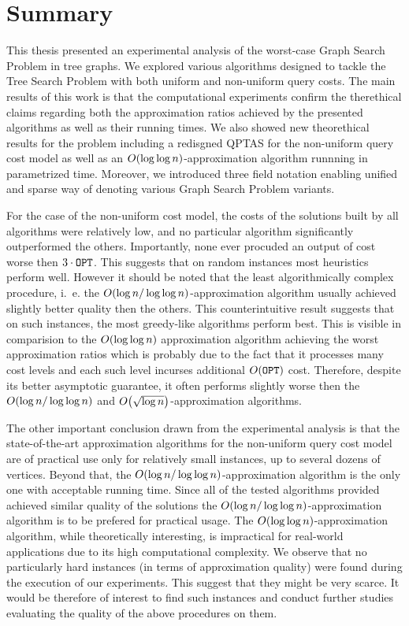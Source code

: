 \chapter{Summary}

This thesis presented an experimental analysis of the worst-case Graph Search Problem in tree graphs. We explored various algorithms designed to tackle the Tree Search Problem with both uniform and non-uniform query costs. The main results of this work is that the computational experiments confirm the therethical claims regarding both the approximation ratios achieved by the presented algorithms as well as their running times. We also showed new theorethical results for the problem including a redisgned QPTAS for the non-uniform query cost model as well as an $O\mathopen{}\left( \log \log n \right)$-approximation algorithm runnning in parametrized time. Moreover, we introduced three field notation enabling unified and sparse way of denoting various Graph Search Problem variants.

For the case of the non-uniform cost model, the costs of the solutions built by all algorithms were relatively low, and no particular algorithm significantly outperformed the others. Importantly, none ever procuded an output of cost worse then $3\cdot\texttt{OPT}$. This suggests that on random instances most heuristics perform well. However it should be noted that the least algorithmically complex procedure, i.~e. the $O\mathopen{}\left( \log n/\log\log n \right)$-approximation algorithm usually achieved slightly better quality then the others. This counterintuitive result suggests that on such instances, the most greedy-like algorithms perform best. This is visible in comparision to the $O\mathopen{}\left( \log \log n \right)$ approximation algorithm achieving the worst approximation ratios which is probably due to the fact that it processes many cost levels and each such level incurses additional $O\mathopen{}\left( \texttt{OPT} \right)$ cost. Therefore, despite its better asymptotic guarantee, it often performs slightly worse then the $O\mathopen{}\left( \log n/\log\log n \right)$ and $O\mathopen{}\left( \sqrt{\log n} \right)$-approximation algorithms.

The other important conclusion drawn from the experimental analysis is that the state-of-the-art approximation algorithms for the non-uniform query cost model are of practical use only for relatively small instances, up to several dozens of vertices. Beyond that, the $O\mathopen{}\left( \log n/\log\log n \right)$-approximation algorithm is the only one with acceptable running time. Since all of the tested algorithms provided achieved similar quality of the solutions the $O\mathopen{}\left( \log n/\log\log n \right)$-approximation algorithm is to be prefered for practical usage. The $O\mathopen{}\left( \log\log n \right)$-approximation algorithm, while theoretically interesting, is impractical for real-world applications due to its high computational complexity. We observe that no particularly hard instances (in terms of approximation quality) were found during the execution of our experiments. This suggest that they might be very scarce. It would be therefore of interest to find such instances and conduct further studies evaluating the quality of the above procedures on them.

